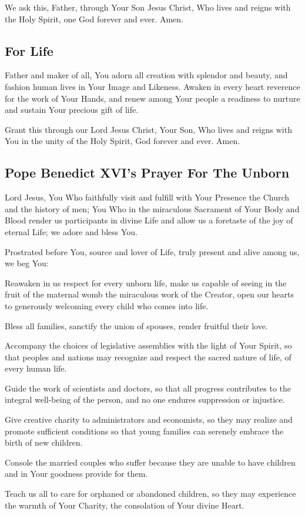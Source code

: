 \documentclass[12pt]{article}
\newcommand{\prayertitle}[1]{\subsection{#1}}
\begin{document}
We ask this, Father, through Your Son Jesus Christ, Who lives and reigns with the Holy Spirit, one God forever and ever.
Amen.

\prayertitle{For Life}
Father and maker of all, You adorn all creation with splendor and beauty, and fashion human lives in Your Image and Likeness.
Awaken in every heart reverence for the work of Your Hands, and renew among Your people
a readiness to nurture and sustain Your precious gift of life.

Grant this through our Lord Jesus Christ, Your Son, Who lives and reigns with You in 
the unity of the Holy Spirit, God forever and ever.
Amen.

\prayertitle{Pope Benedict XVI's Prayer For The Unborn}
\label{prayer:benedict_xvi_unborn}
Lord Jesus, 
You Who faithfully visit and fulfill with Your Presence the Church and the history of men;
You Who in the miraculous Sacrament of Your Body and Blood render us participants in divine Life and allow us a foretaste of the joy of eternal Life;
we adore and bless You.

Prostrated before You, source and lover of Life, truly present and alive among us, we beg You:

Reawaken in us respect for every unborn life, make us capable of seeing in the fruit of the maternal womb the miraculous work of the Creator, open our hearts to generously welcoming every child who comes into life.

Bless all families, sanctify the union of spouses, render fruitful their love.

Accompany the choices of legislative assemblies with the light of Your Spirit, so that peoples and nations may recognize and respect the sacred nature of life, of every human life.

Guide the work of scientists and doctors, so that all progress contributes to the integral well-being of the person, and no one endures suppression or injustice.

Give creative charity to administrators and economists, so they may realize and promote sufficient conditions so that young families can serenely embrace the birth of new children.

Console the married couples who suffer because they are unable to have children and in Your goodness provide for them.

Teach us all to care for orphaned or abandoned children, so they may experience the warmth of Your Charity, the consolation of Your divine Heart.
\end{document}
